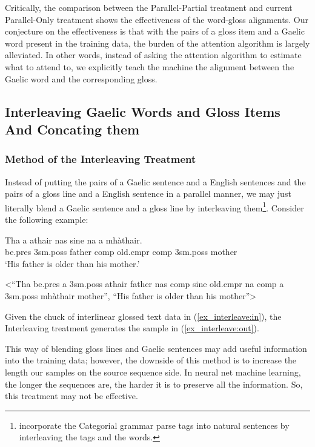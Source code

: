 \documentclass[a4paper]{article}
\begin{document}
Critically, the comparison between the Parallel-Partial treatment and current Parallel-Only treatment shows the effectiveness of the word-gloss alignments. Our conjecture on the effectiveness is that with the pairs of a gloss item and a Gaelic word present in the training data, the burden of the attention algorithm \citep{bahdanau2014neural} is largely alleviated. In other words, instead of asking the attention algorithm to estimate what to attend to, we explicitly teach the machine the alignment between the Gaelic word and the corresponding gloss. 

\subsection{Interleaving Gaelic Words and Gloss Items And Concating them}\label{treatment:InterleavingAndConCat}
\subsubsection{Method of the Interleaving Treatment}
Instead of putting the pairs of a Gaelic sentence and a English sentences and the pairs of a gloss line and a English sentence in a parallel manner, we may just literally blend a Gaelic sentence and a gloss line by interleaving them\footnote{\citet{ccg_target_seq} incorporate the Categorial grammar parse tags into natural sentences by interleaving the tags and the words.}. Consider the following example:

\begin{exe} 
\ex 
	\begin{xlist}
	\ex \label{ex_interleave:in}
		\gll	 Tha a athair nas sine na a mh\`athair.\\  
     		     be.pres 3sm.poss father comp old.cmpr comp 3sm.poss mother \\
    	\glt    `His father is older than his mother.'  

    \ex \label{ex_interleave:out} <``Tha be.pres a 3sm.poss athair father nas comp sine old.cmpr na comp a 3sm.poss mh\`athair mother'', ``His father is older than his mother''>
    \end{xlist}
\end{exe}

Given the chuck of interlinear glossed text data in (\ref{ex_interleave:in}), the Interleaving treatment generates the sample in (\ref{ex_interleave:out}).  

This way of blending gloss lines and Gaelic sentences may add useful information into the training data; however, the downside of this method is to increase the length our samples on the source sequence side. In neural net machine learning, the longer the sequences are, the harder it is to preserve all the information. So, this treatment may not be effective. 
\end{document}
